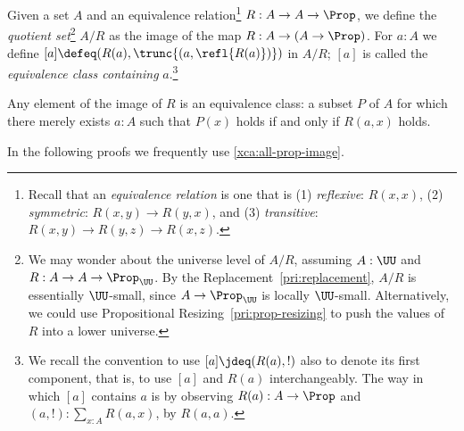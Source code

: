\begin{definition}\label{def:quotient-set}
Given a set $A$ and an equivalence relation\footnote{%
  Recall that an \emph{equivalence relation} is one that is
  (1) \emph{reflexive}: $R(x,x)$,
  (2) \emph{symmetric}: $R(x,y) \to R(y,x)$, and
  (3) \emph{transitive}: $R(x,y) \to R(y,z) \to R(x,z)$.}
$R : A \to A \to \Prop$,
we define the \emph{quotient set}\footnote{%
  We may wonder about the universe level of $A/R$,
  assuming $A : \UU$ and $R : A \to A \to \Prop_\UU$.
  By the Replacement~\cref{pri:replacement},
  $A/R$ is essentially $\UU$-small, since $A\to\Prop_\UU$
  is locally $\UU$-small. Alternatively, we could use
  Propositional Resizing~\cref{pri:prop-resizing} to push
  the values of $R$ into a lower universe.}
$A/R$ as the image of the map $R : A \to (A \to \Prop)$.
For $a:A$ we define $[a] \defeq (R(a),\trunc{(a,\refl{R(a)})})$ in $A/R$;
$[a]$ is called the \emph{equivalence class containing} $a$.\footnote{%
We recall the convention to use $[a]\jdeq(R(a),!)$ also to denote
its first component, that is, to use $[a]$ and $R(a)$ interchangeably.
The way in which $[a]$ contains $a$ is by observing $R(a): A\to\Prop$
and $(a,!):\sum_{x:A} R(a,x)$, by $R(a,a)$.}
\end{definition}
Any element of the image of $R$ is an equivalence class:
a subset $P$ of $A$ for which there merely exists $a:A$
such that $P(x)$ holds if and only if $R(a,x)$ holds.

In the following proofs we frequently use \cref{xca:all-prop-image}.

